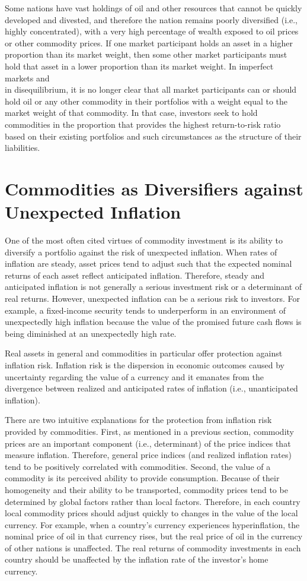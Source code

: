\documentclass[11pt]{article}
\begin{document}
Some nations have vast holdings of oil and other resources that cannot be quickly developed and divested, and therefore the nation remains poorly diversified (i.e., highly concentrated), with a very high percentage of wealth exposed to oil prices or other commodity prices. If one market participant holds an asset in a higher proportion than its market weight, then some other market participants must hold that asset in a lower proportion than its market weight. In imperfect markets and\\
in disequilibrium, it is no longer clear that all market participants can or should hold oil or any other commodity in their portfolios with a weight equal to the market weight of that commodity. In that case, investors seek to hold commodities in the proportion that provides the highest return-to-risk ratio based on their existing portfolios and such circumstances as the structure of their liabilities.

\section*{Commodities as Diversifiers against Unexpected Inflation}
One of the most often cited virtues of commodity investment is its ability to diversify a portfolio against the risk of unexpected inflation. When rates of inflation are steady, asset prices tend to adjust such that the expected nominal returns of each asset reflect anticipated inflation. Therefore, steady and anticipated inflation is not generally a serious investment risk or a determinant of real returns. However, unexpected inflation can be a serious risk to investors. For example, a fixed-income security tends to underperform in an environment of unexpectedly high inflation because the value of the promised future cash flows is being diminished at an unexpectedly high rate.

Real assets in general and commodities in particular offer protection against inflation risk. Inflation risk is the dispersion in economic outcomes caused by uncertainty regarding the value of a currency and it emanates from the divergence between realized and anticipated rates of inflation (i.e., unanticipated inflation).

There are two intuitive explanations for the protection from inflation risk provided by commodities. First, as mentioned in a previous section, commodity prices are an important component (i.e., determinant) of the price indices that measure inflation. Therefore, general price indices (and realized inflation rates) tend to be positively correlated with commodities. Second, the value of a commodity is its perceived ability to provide consumption. Because of their homogeneity and their ability to be transported, commodity prices tend to be determined by global factors rather than local factors. Therefore, in each country local commodity prices should adjust quickly to changes in the value of the local currency. For example, when a country's currency experiences hyperinflation, the nominal price of oil in that currency rises, but the real price of oil in the currency of other nations is unaffected. The real returns of commodity investments in each country should be unaffected by the inflation rate of the investor's home currency.
\end{document}
